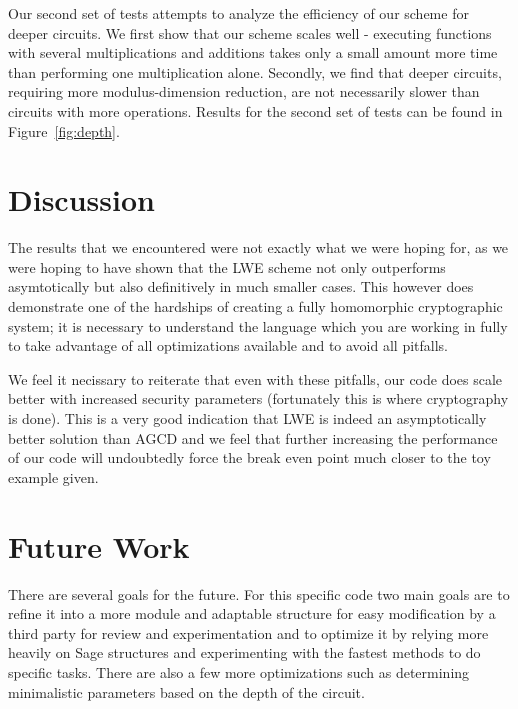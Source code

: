 \documentclass[letterpaper,twocolumn,10pt]{article}
\begin{document}
Our second set of tests attempts to analyze the efficiency of our scheme for deeper circuits. We first show that our scheme scales well - executing functions with several multiplications and additions takes only a small amount more time than performing one multiplication alone. Secondly, we find that deeper circuits, requiring more modulus-dimension reduction, are not necessarily slower than circuits with more operations. Results for the second set of tests can be found in Figure~\ref{fig:depth}.


\section{Discussion}
The results that we encountered were not exactly what we were hoping for, as we were hoping to have shown that the LWE scheme not only outperforms asymtotically but also definitively in much smaller cases. This however does demonstrate one of the hardships of creating a fully homomorphic cryptographic system; it is necessary to understand the language which you are working in fully to take advantage of all optimizations available and to avoid all pitfalls.

We feel it necissary to reiterate that even with these pitfalls, our code does scale better with increased security parameters (fortunately this is where cryptography is done). This is a very good indication that LWE is indeed an asymptotically better solution than AGCD and we feel that further increasing the performance of our code will undoubtedly force the break even point much closer to the toy example given.



\section{Future Work}
There are several goals for the future. For this specific code two main goals are to refine it into a more module and adaptable structure for easy modification by a third party for review and experimentation and to optimize it by relying more heavily on Sage structures and experimenting with the fastest methods to do specific tasks. There are also a few more optimizations such as determining minimalistic parameters based on the depth of the circuit. 
\end{document}
